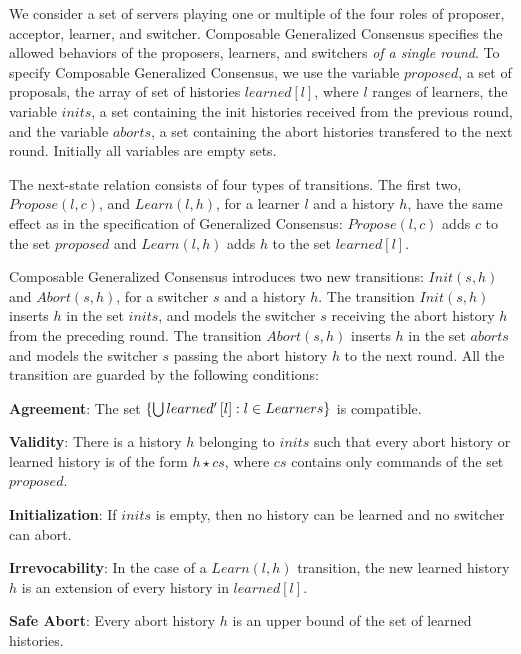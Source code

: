 We consider a set of servers playing one or multiple of the four roles of proposer, acceptor, learner, and switcher. 
Composable Generalized Consensus specifies the allowed behaviors of the proposers, learners, and switchers
\emph{of a single round}. 
To specify Composable Generalized Consensus, we use the variable $proposed$, a set of proposals, the array of set of histories $learned\left[ l \right]$, where $l$ ranges of learners, the variable $inits$, a set containing the init histories received from the previous
round, and the variable $aborts$, a set containing the abort histories transfered to the next round.
Initially all variables are empty sets.

The next-state relation
consists of four types of transitions. The first two, $Propose\left( l, c \right)$, and $Learn\left( l, h \right)$, for a learner $l$ and a
history $h$, have the same effect as in the specification of Generalized Consensus: 
$Propose\left( l,c \right)$ adds $c$ to the set $proposed$ and $Learn\left( l,h \right)$ adds $h$ to the set $learned\left[ l \right]$.

Composable Generalized Consensus introduces two new transitions: $Init\left( s, h \right)$ and $Abort\left( s, h
\right)$, for a switcher $s$ and a history $h$. The transition $Init\left( s,h \right)$ inserts $h$ in the set $inits$, and models the switcher $s$ receiving
the abort history $h$ from the preceding round. The transition $Abort\left( s, h \right)$ inserts $h$ in the set $aborts$ and models the switcher $s$ passing the abort history $h$ to the next round.  
All the transition are guarded by the following conditions:
\begin{compactitem}
    \item[\textbf{Agreement}:] The set $\left\{\bigcup learned'\left[ l
      \right] : l \in Learners\right\}$ is compatible.
    \item[\textbf{Validity}:] There is a history $h$ belonging to $inits$ such that every abort history or learned history 
        is of the form $h \star cs$, where $cs$ contains only commands
        of the set $proposed$.
    \item[\textbf{Initialization}:] If $inits$ is empty, then no
        history can be learned and no switcher can abort.
    \item[\textbf{Irrevocability}:] In the case of a $Learn\left( l,h
        \right)$ transition, the new learned history $h$ is an 
        extension of every history in $learned\left[ l \right]$.
    \item[\textbf{Safe Abort}:] Every abort history $h$ is an upper bound of the set of learned histories.
\end{compactitem}

